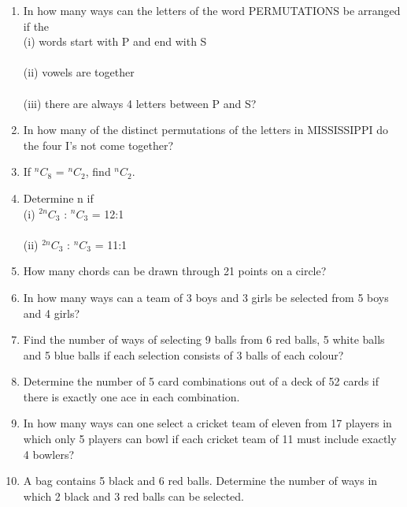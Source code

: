 \begin{enumerate}[label=\arabic*.,ref=\thesubsection.\theenumi]
\item In how many ways can the letters of the word PERMUTATIONS be arranged if the\\
(i) words start with P and end with S\\
\\(ii) vowels are together\\
\\(iii) there are always 4 letters between P and S?\\

\item In how many of the distinct permutations of the letters in MISSISSIPPI do the four I's not come together?\\

\item If $^nC_8 $ = $^nC_2 $, find $^nC_2 $.

\item Determine n if\\
(i) $^{2n}C_3 $ : $^nC_3 $ = 12:1\\
\\(ii) $^{2n}C_3 $ : $^nC_3 $ = 11:1\\

\item How many chords can be drawn through 21 points on a circle?\\

\item In how many ways can a team of 3 boys and 3 girls be selected from 5 boys and 4 girls?\\

\item Find the number of ways of selecting 9 balls from 6 red balls, 5 white balls and 5 blue balls if each selection consists of 3 balls of each colour?\\

\item Determine the number of 5 card combinations out of a deck of 52 cards if there is exactly one ace in each combination.\\

\item In how many ways can one select a cricket team of eleven from 17 players in which only 5 players can bowl if each cricket team of 11 must include exactly 4 bowlers?\\

\item A bag contains 5 black and 6 red balls. Determine the number of ways in which 2 black and 3 red balls can be selected.\\


\end{enumerate}
